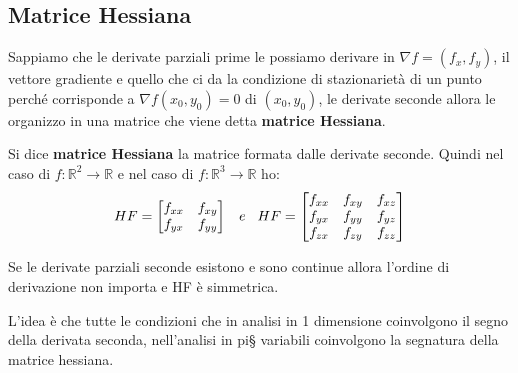\subsection{Matrice Hessiana}
Sappiamo che le derivate parziali prime le possiamo derivare in $\nabla f = (f_x, f_y)$, il vettore gradiente e quello che ci da la condizione di stazionarietà di un punto perché corrisponde a $\nabla f(x_0,y_0) = 0$ di $(x_0,y_0)$, le derivate seconde allora le organizzo in una matrice che viene detta \textbf{matrice Hessiana}.
\begin{definition}
Si dice \textbf{matrice Hessiana} la matrice formata dalle derivate seconde. Quindi nel caso di $f: \mathbb{R}^2\to \mathbb{R}$ e nel caso di $f: \mathbb{R}^3\to \mathbb{R}$ ho:
\[HF = \begin{bmatrix}f_{xx} & f_{xy} \\ f_{yx} & f_{yy}\end{bmatrix} \hspace{.3cm} e \hspace{.3cm} HF = \begin{bmatrix}f_{xx} & f_{xy} & f_{xz} \\ f_{yx} & f_{yy} & f_{yz} \\ f_{zx} & f_{zy} & f_{zz}\end{bmatrix}\]
\end{definition}

\begin{observation}
Se le derivate parziali seconde esistono e sono continue allora l'ordine di derivazione non importa e HF è simmetrica.
\end{observation}
\hspace{-15pt}L'idea è che tutte le condizioni che in analisi in 1 dimensione coinvolgono il segno della derivata seconda, nell'analisi in pi§ variabili coinvolgono la segnatura della matrice hessiana.

